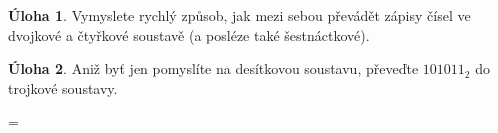\documentclass[10pt,a5paper]{article}
\theoremstyle{definition}
\newtheorem{uloha}{Úloha}
\newtheorem{suloha}[uloha]{\llap{$\star$ }Úloha}
\def\vysld{}
\let\printvysl\relax
\begin{document}
\begin{uloha}
Vymyslete rychlý způsob, jak mezi sebou převádět zápisy čísel ve dvojkové a čtyřkové soustavě (a posléze také šestnáctkové).
\end{uloha}

\begin{suloha}
Aniž byť jen pomyslíte na desítkovou soustavu, převeďte $101011_2$ do trojkové soustavy.
\end{suloha}


\newpage
\parindent=0pt
\parskip=\smallskipamount
\def\printvysl#1#2{\textbf{#1.}\ #2\par}
\vysld
\end{document}
